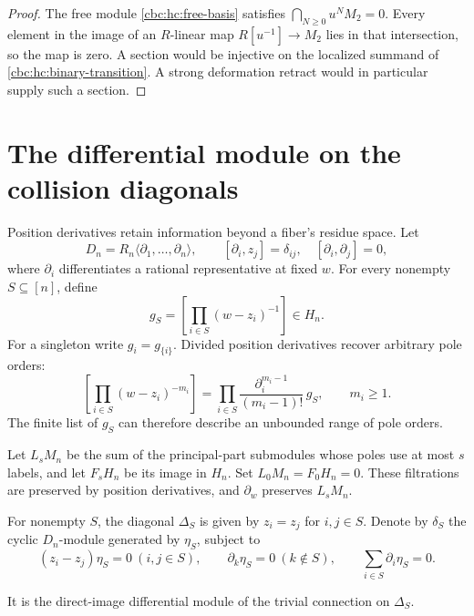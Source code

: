 \begin{proof}
The free module \eqref{cbc:hc:free-basis} satisfies
$\bigcap_{N\geq0}u^NM_2=0$. Every element in the image of an
$R$-linear map $R[u^{-1}]\to M_2$ lies in that intersection,
so the map is zero. A section would be injective on the
localized summand of \eqref{cbc:hc:binary-transition}.
A strong deformation retract would in particular supply
such a section.
\end{proof}

\section{The differential module on the collision diagonals}
\label{cbc:hc:diagonals}

Position derivatives retain information beyond a fiber's residue
space. Let
\[
 D_n=R_n\langle\partial_1,\ldots,\partial_n\rangle,
 \qquad [\partial_i,z_j]=\delta_{ij},\quad
 [\partial_i,\partial_j]=0,
\]
where $\partial_i$ differentiates a rational representative at
fixed $w$. For every nonempty $S\subseteq[n]$, define
\begin{equation}\label{cbc:hc:subset-generator}
 g_S=\left[\prod_{i\in S}(w-z_i)^{-1}\right]\in H_n.
\end{equation}
For a singleton write $g_i=g_{\{i\}}$.
Divided position derivatives recover arbitrary pole orders:
\begin{equation}\label{cbc:hc:divided-derivatives}
 \left[\prod_{i\in S}(w-z_i)^{-m_i}\right]
 =\prod_{i\in S}\frac{\partial_i^{m_i-1}}{(m_i-1)!}\,g_S,
 \qquad m_i\geq1.
\end{equation}
The finite list of $g_S$ can therefore describe an unbounded
range of pole orders.

Let $L_sM_n$ be the sum of the principal-part submodules whose
poles use at most $s$ labels, and let $F_sH_n$ be its image in
$H_n$. Set $L_0M_n=F_0H_n=0$. These filtrations are preserved
by position derivatives, and $\partial_w$ preserves $L_sM_n$.

For nonempty $S$, the diagonal $\Delta_S$ is given by
$z_i=z_j$ for $i,j\in S$. Denote by $\delta_S$ the cyclic
$D_n$-module generated by $\eta_S$, subject to
\begin{equation}\label{cbc:hc:delta-relations}
 (z_i-z_j)\eta_S=0\ (i,j\in S),\qquad
 \partial_k\eta_S=0\ (k\notin S),\qquad
 \sum_{i\in S}\partial_i\eta_S=0.
\end{equation}

It is the direct-image differential module of the trivial
connection on $\Delta_S$.

